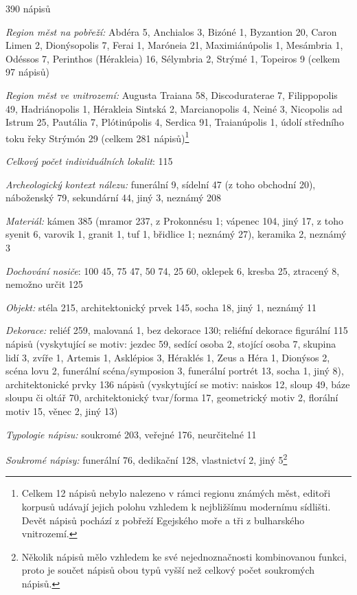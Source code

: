 \placetable[none]{}
\starttable[|l|]
\HL
{} 390 nápisů

{\em Region měst na pobřeží:} Abdéra 5, Anchialos 3, Bizóné 1, Byzantion 20, Caron Limen 2, Dionýsopolis 7, Ferai 1, Maróneia 21, Maximiánúpolis 1, Mesámbria 1, Odéssos 7, Perinthos (Hérakleia) 16, Sélymbria 2, Strýmé 1, Topeiros 9 (celkem 97 nápisů)

{\em Region měst ve vnitrozemí:} Augusta Traiana 58, Discoduraterae 7, Filippopolis 49, Hadriánopolis 1, Hérakleia Sintská 2, Marcianopolis 4, Neiné 3, Nicopolis ad Istrum 25, Pautália 7, Plótinúpolis 4, Serdica 91, Traianúpolis 1, údolí středního toku řeky Strýmón 29 (celkem 281 nápisů)\footnote{Celkem 12 nápisů nebylo nalezeno v rámci regionu známých měst, editoři korpusů udávají jejich polohu vzhledem k nejbližšímu modernímu sídlišti. Devět nápisů pochází z pobřeží Egejského moře a tři z bulharského vnitrozemí.}

{\em Celkový počet individuálních lokalit}: 115

{\em Archeologický kontext nálezu:} funerální 9, sídelní 47 (z toho obchodní 20), náboženský 79, sekundární 44, jiný 3, neznámý 208

{\em Materiál:} kámen 385 (mramor 237, z Prokonnésu 1; vápenec 104, jiný 17, z toho syenit 6, varovik 1, granit 1, tuf 1, břidlice 1; neznámý 27), keramika 2, neznámý 3

{\em Dochování nosiče}: 100  45, 75  47, 50  74, 25  60, oklepek 6, kresba 25, ztracený 8, nemožno určit 125

{\em Objekt:} stéla 215, architektonický prvek 145, socha 18, jiný 1, neznámý 11

{\em Dekorace:} reliéf 259, malovaná 1, bez dekorace 130; reliéfní dekorace figurální 115 nápisů (vyskytující se motiv: jezdec 59, sedící osoba 2, stojící osoba 7, skupina lidí 3, zvíře 1, Artemis 1, Asklépios 3, Héraklés 1, Zeus a Héra 1, Dionýsos 2, scéna lovu 2, funerální scéna/symposion 3, funerální portrét 13, socha 1, jiný 8), architektonické prvky 136 nápisů (vyskytující se motiv: naiskos 12, sloup 49, báze sloupu či oltář 70, architektonický tvar/forma 17, geometrický motiv 2, florální motiv 15, věnec 2, jiný 13)

{\em Typologie nápisu:} soukromé 203, veřejné 176, neurčitelné 11

{\em Soukromé nápisy:} funerální 76, dedikační 128, vlastnictví 2, jiný 5\footnote{Několik nápisů mělo vzhledem ke své nejednoznačnosti kombinovanou funkci, proto je součet nápisů obou typů vyšší než celkový počet soukromých nápisů.}

